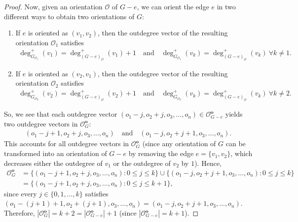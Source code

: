 \documentclass[12pt]{article}
\theoremstyle{definition}
\theoremstyle{remark}
\newcommand{\abs}[1]{\left| #1 \right|}
\newcommand{\out}{\mathscr{O}}
\begin{document}
\begin{proof}
	Now, given an orientation $\mathcal{O}$ of $G-e$, we can orient the edge $e$ in two different ways to obtain two orientations of $G$:
	\begin{enumerate}
        \item If $e$ is oriented as $(v_1,v_2)$, then the outdegree vector of the resulting orientation $\mathcal{O}_1$ satisfies \begin{align*}
            \deg_{G_{\mathcal{O}_1}}^+(v_1) = \deg_{(G-e)_{\mathcal{O}}}^+(v_1)+1 \quad \text{and} \quad \deg_{G_{\mathcal{O}_1}}^+(v_k) = \deg_{(G-e)_{\mathcal{O}}}^+(v_k) \ \forall k \neq 1.
        \end{align*} 
        \item If $e$ is oriented as $(v_2,v_1)$, then the outdegree vector of the resulting orientation $\mathcal{O}_2$ satisfies \begin{align*}
            \deg_{G_{\mathcal{O}_2}}^+(v_2) = \deg_{(G-e)_{\mathcal{O}}}^+(v_2)+1 \quad \text{and} \quad \deg_{G_{\mathcal{O}_2}}^+(v_k) = \deg_{(G-e)_{\mathcal{O}}}^+(v_k) \ \forall k \neq 2.
        \end{align*} 
    \end{enumerate}
	So, we see that each outdegree vector $(o_1-j,o_2+j,o_3,\ldots,o_n) \in \out_{G-e}^\textbf{o}$ yields two outdegree vectors in $\out_{G}^\textbf{o}$: \begin{align*}
        (o_1-j+1,o_2+j,o_3,\ldots,o_n) \quad \text{and} \quad (o_1-j,o_2+j+1,o_3,\ldots,o_n).
    \end{align*}
	This accounts for all outdegree vectors in $\out_{G}^\textbf{o}$ (since any orientation of $G$ can be transformed into an orientation of $G-e$ by removing the edge $e=\{v_1,v_2\}$, which decreases either the outdegree of $v_1$ or the outdegree of $v_2$ by $1$).
	Hence,
	\begin{align*}
        \out_{G}^{\textbf{o}}
		&= \{(o_1-j+1,o_2+j,o_3,\ldots,o_n) : 0 \leq j \leq k\}
		\cup \{(o_1-j,o_2+j+1,o_3,\ldots,o_n) : 0 \leq j \leq k\} \\
		&= \{(o_1-j+1,o_2+j,o_3,\ldots,o_n) : 0 \leq j \leq k+1\},
    \end{align*}
	since every $j \in \{0,1,\ldots,k\}$ satisfies $
        (o_1-(j+1)+1,o_2+(j+1),o_3,\ldots,o_n) = (o_1-j,o_2+j+1,o_3,\ldots,o_n)
    $.
	Therefore,
	$\abs{\out_G^\textbf{o}} = k+2 = \abs{\out_{G-e}^\textbf{o}}+1$ (since $\abs{\out_{G-e}^\textbf{o}} = k+1$).


\end{proof}
\end{document}
